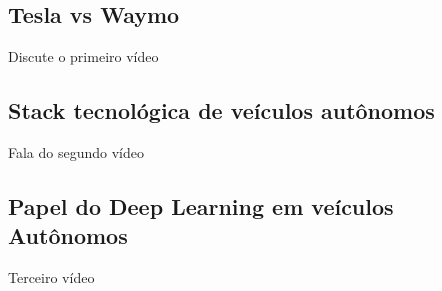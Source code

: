 \subsection{Tesla vs Waymo}

Discute o primeiro vídeo \cite{cleanerwatt}

\subsection{Stack tecnológica de veículos autônomos}

Fala do segundo vídeo \cite{frankyoutube}

\subsection{Papel do Deep Learning em veículos Autônomos}

Terceiro vídeo \cite{basicthinking}
